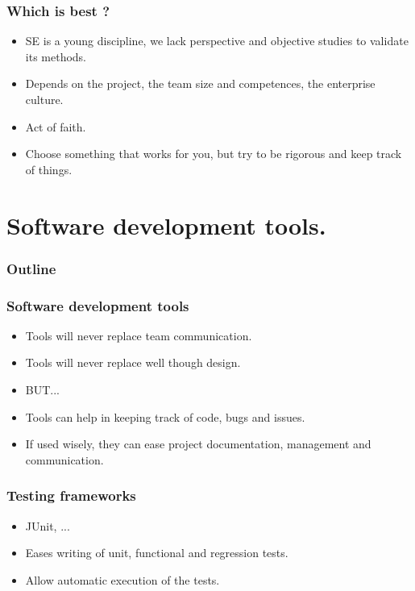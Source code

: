 \documentclass[10pt]{beamer}
\begin{document}
\begin{frame}[fragile]
  \frametitle{Which is best ?}
  \begin{itemize}
    \item SE is a young discipline, we lack perspective and objective studies to
      validate its methods.
    \item Depends on the project, the team size and competences, the enterprise
      culture.
    \item Act of faith.
    \item Choose something that works for you, but try to be rigorous and keep
      track of things.
  \end{itemize}
\end{frame}

\section{Software development tools.}

\begin{frame}
  \frametitle{Outline}
  \tableofcontents[currentsection]
\end{frame}

\begin{frame}[fragile]
  \frametitle{Software development tools}
  \begin{itemize}
  \item Tools will never replace team communication.
  \item Tools will never replace well though design.
  \item BUT...
  \item Tools can help in keeping track of code, bugs and issues.
  \item If used wisely, they can ease project documentation,
    management and communication.
  \end{itemize}
\end{frame}
\begin{frame}[fragile]
  \frametitle{Testing frameworks}
  \begin{itemize}
  \item JUnit, ...
  \item Eases writing of unit, functional and regression tests.
  \item Allow automatic execution of the tests.
  \end{itemize}
\end{frame}
\end{document}
